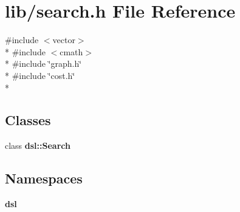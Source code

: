 \section{lib/search.h File Reference}
\label{lib_2search_8h}
{\ttfamily \#include $<$vector$>$}\\*
{\ttfamily \#include $<$cmath$>$}\\*
{\ttfamily \#include \char`\"{}graph.\-h\char`\"{}}\\*
{\ttfamily \#include \char`\"{}cost.\-h\char`\"{}}\\*
\subsection*{Classes}
\begin{DoxyCompactItemize}
\item 
class {\bf dsl\-::\-Search}
\end{DoxyCompactItemize}
\subsection*{Namespaces}
\begin{DoxyCompactItemize}
\item 
{\bf dsl}
\end{DoxyCompactItemize}
